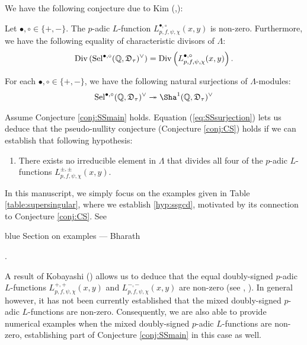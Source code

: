 \documentclass[a4paper,11pt]{article}
\newcommand{\BP}[1]{
	\begin{color}{blue}
		\marginpar{$\heartsuit$} #1
		--- Bharath
	\end{color}
}
\numberwithin{equation}{section}
\newcommand{\Sel}{\mathrm{Sel}}
\newcommand{\DDD}{\mathfrak{D}}
\begin{document}
We have the following conjecture due to Kim (\cite[Conjecture 3.1]{MR3224266},\cite[Conjecture 6.7]{wanss}):
\begin{conjecture}\label{conj:SSmain}
Let $\bullet, \circ \in \{+,-\}$. The $p$-adic $L$-function $L^{\bullet,\circ}_{p,f,\psi,\chi}(x,y)$ is non-zero. Furthermore, we have the following equality of characteristic divisors of $\Lambda$:
\begin{align*}
\mathrm{Div} \left(\Sel^{\bullet,\circ}(\Q,\DDD_\tau)^\vee\right) = \Div\left(L^{\bullet,\circ}_{p,f,\psi,\chi}(x,y)\right).
\end{align*}
\end{conjecture}

For each $\bullet, \circ \in \{+,-\}$, we have the following natural surjections of $\Lambda$-modules:
\begin{align} \label{eq:SSsurjection}
\Sel^{\bullet, \circ}(\Q,\DDD_\tau)^\vee  \twoheadrightarrow \Sha^1(\Q,\DDD_\tau)^\vee
\end{align}

Assume Conjecture \ref{conj:SSmain} holds. Equation (\ref{eq:SSsurjection}) lets us deduce that the pseudo-nullity conjecture (Conjecture \ref{conj:CS}) holds if we can establish that following hypothesis:
\begin{enumerate}[style=sameline, style=sameline, align=left,label=(\textsc{ss:gcd}) --- , ref=(\textsc{ss:gcd})]
\item\label{hyp:ssgcd} There exists no irreducible element in $\Lambda$ that divides all four of the $p$-adic $L$-functions $L^{\pm,\pm}_{p,f,\psi,\chi}(x,y)$.
\end{enumerate}

In this manuscript, we simply focus on the examples given in Table \ref{table:supersingular}, where we establish  \ref{hyp:ssgcd}, motivated by its connection to Conjecture \ref{conj:CS}. See \BP{Section on examples}.

A result of Kobayashi (\cite{MR1965358}) allows us to deduce that the equal doubly-signed $p$-adic $L$-functions $L^{+,+}_{p,f,\psi,\chi}(x,y)$ and $L^{-,-}_{p,f,\psi,\chi}(x,y)$ are non-zero (see \cite[Proposition 3.5]{CCSS17}, \cite[Remark 8.5]{lei2018codimension}). In general however, it has not been currently established that the mixed doubly-signed $p$-adic $L$-functions are non-zero. Consequently, we are also able to provide numerical examples when the mixed doubly-signed $p$-adic $L$-functions are non-zero, establishing part of Conjecture \ref{conj:SSmain} in this case as well.
\end{document}
